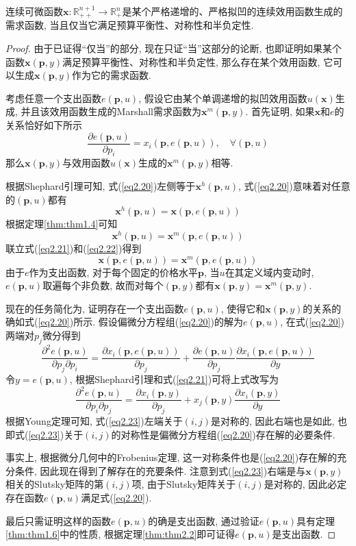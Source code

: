 \documentclass[cn, 12pt, math=mtpro2, bibstyle=apa, blue, twocol]{elegantbook}
\newcommand{\R}{\mathbb{R}}
\newcommand{\p}{\mathbf{p}}
\newcommand{\x}{\mathbf{x}}
\begin{document}
\begin{theorem}[可积性定理]
  连续可微函数$\x:\R_{++}^{n+1}\to \R_+^n$是某个严格递增的、严格拟凹的连续效用函数生成的需求函数, 当且仅当它满足预算平衡性、对称性和半负定性.
\end{theorem}
\begin{proof}
  由于已证得“仅当”的部分, 现在只证“当”这部分的论断, 也即证明如果某个函数$\x(\p,y)$满足预算平衡性、对称性和半负定性, 那么存在某个效用函数, 它可以生成$\x(\p,y)$作为它的需求函数.
  
  考虑任意一个支出函数$e(\p,u)$, 假设它由某个单调递增的拟凹效用函数$u(\x)$生成, 并且该效用函数生成的Marshall需求函数为$\x^m(\p,y)$. 首先证明, 如果$\x$和$e$的关系恰好如下所示
  \begin{equation}\label{eq2.20}
    \frac{\partial e(\p,u)}{\partial p_i}=x_i(\p,e(\p,u)),\quad \forall (\p,u)
  \end{equation}
  那么$\x(\p,y)$与效用函数$u(\x)$生成的$\x^m(\p,y)$相等.
  
  根据Shephard引理可知, 式(\ref{eq2.20})左侧等于$\x^h(\p,u)$, 式(\ref{eq2.20})意味着对任意的$(\p,u)$都有
  \begin{equation}\label{eq2.21}
    \x^h(\p,u)=\x(\p,e(\p,u))
  \end{equation}
  根据定理\ref{thm:thm1.4}可知
  \begin{equation}\label{eq2.22}
    \x^h(\p,u)=\x^m(\p,e(\p,u))
  \end{equation}
  联立式(\ref{eq2.21})和(\ref{eq2.22})得到
  $$\x(\p,e(\p,u))=\x^m(\p,e(\p,u))$$
  由于$e$作为支出函数, 对于每个固定的价格水平$\p$, 当$u$在其定义域内变动时, $e(\p,u)$取遍每个非负数, 故而对每个$(\p,y)$都有$\x(\p,y)=\x^m(\p,y)$.
  
  现在的任务简化为, 证明存在一个支出函数$e(\p,u)$, 使得它和$\x(\p,y)$的关系的确如式(\ref{eq2.20})所示. 假设偏微分方程组(\ref{eq2.20})的解为$e(\p,u)$, 在式(\ref{eq2.20})两端对$p_j$微分得到
  $$\frac{\partial^2 e(\p,u)}{\partial p_j\partial p_i}=\frac{\partial x_i(\p,e(\p,u))}{\partial p_j}+\frac{\partial e(\p,u)}{\partial p_j}\frac{\partial x_i(\p,e(\p,u))}{\partial y}$$
  令$y=e(\p,u)$, 根据Shephard引理和式(\ref{eq2.21})可将上式改写为
  \begin{equation}\label{eq2.23}
    \frac{\partial^2e(\p,u)}{\partial p_i\partial p_j}=\frac{\partial x_i(\p,y)}{\partial p_j}+x_j(\p,y)\frac{\partial x_i(\p,y)}{\partial y}
  \end{equation}
  根据Young定理可知, 式(\ref{eq2.23})左端关于$(i,j)$是对称的, 因此右端也是如此, 也即式(\ref{eq2.23})关于$(i,j)$的对称性是偏微分方程组(\ref{eq2.20})存在解的必要条件.
  
  事实上, 根据微分几何中的Frobenius定理, 这一对称条件也是(\ref{eq2.20})存在解的充分条件, 因此现在得到了解存在的充要条件. 注意到式(\ref{eq2.23})右端是与$\x(\p,y)$相关的Slutsky矩阵的第$(i,j)$项, 由于Slutsky矩阵关于$(i,j)$是对称的, 因此必定存在函数$e(\p,u)$满足式(\ref{eq2.20}).
  
  最后只需证明这样的函数$e(\p,u)$的确是支出函数, 通过验证$e(\p,u)$具有定理\ref{thm:thm1.6}中的性质, 根据定理\ref{thm:thm2.2}即可证得$e(\p,u)$是支出函数.
\end{proof}
\end{document}
